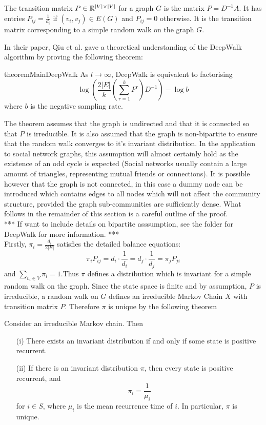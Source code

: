 \documentclass[a4paper]{article}
\begin{document}
\begin{definition}
  The transition matrix $P \in \R^{|V| \times |V|}$ for a graph $G$ is the
  matrix $P = D^{-1}A$. It has entries $P_{ij} = \frac{1}{d_i}$ if $(v_i, v_j)
  \in E(G)$ and $P_{ij} = 0$ otherwise. It is the transition matrix
  corresponding to a simple random walk on the graph $G$. 
\end{definition}
In their paper, Qiu et al. gave a theoretical understanding of the DeepWalk
algorithm by proving the following theorem:
\begin{restatable}{theorem}{MainDeepWalk}
  As $l \to \infty$, DeepWalk is equivalent to factorising
  \[\log{\left(\frac{2|E|}{k}\left( \sum_{r = 1}^k P^r  \right) D^{-1}
      \right)} - \log{b}\]
  where $b$ is the negative sampling rate.
\end{restatable}
The theorem assumes that the graph is undirected and that it is connected so
that $P$ is irreducible. It is also assumed that the graph is
non-bipartite to ensure that the random walk converges to it's invariant distribution. In the application to
social network graphs, this
assumption will almost certainly hold as the existence of an odd cycle is
expected (Social networks usually contain a large amount of triangles,
representing mutual friends or connections). It is possible however that the
graph is not connected, in this case a dummy node can be introduced which
contains edges to all nodes which will not affect the community structure,
provided the graph sub-communities are sufficiently dense.
What follows in the remainder of this section is a careful outline of the proof.\\
*** If want to include details on bipartite asssumption, see the folder for
DeepWalk for more information. ***\\
Firstly, $\pi_i = \frac{d_i}{2|E|}$ satisfies the detailed balance equations:
\[\pi_i P_{ij} = d_i\cdot \frac{1}{d_i} = d_j \cdot \frac{1}{d_j} = \pi_j P_{ji}\]
and $\sum_{v_i \in V} \pi_i = 1$.Thus $\pi$ defines a distribution which is
invariant for a simple random walk on the graph. Since the state space is
finite and by assumption, $P$ is irreducible, a random walk on $G$ defines an
irreducible Markov Chain $X$ with transition matrix $P$. Therefore $\pi$ is
unique by the following theorem
\begin{theorem}
  Consider an irreducible Markov chain. Then
  \begin{itemize}
  \item[(i)] There exists an invariant distribution if and only if some state is
    positive recurrent.
  \item[(ii)] If there is an invariant distribution $\pi$, then every state is
    positive recurrent, and
    \[\pi_i = \frac{1}{\mu_i}\]
    for $i \in S$, where $\mu_i$ is the mean recurrence time of $i$. In
    particular, $\pi$ is unique.
  \end{itemize}
\end{theorem}
\end{document}

